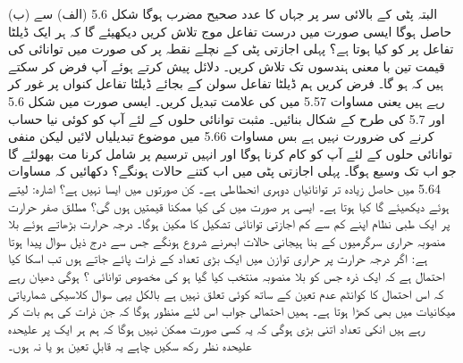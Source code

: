 (ب)  البتہ پٹی کے بالائی سر پر جہاں   کا عدد صحیح مضرب ہوگا شکل \num{5.6} (الف) سے  حاصل ہوگا ایسی صورت میں درست تفاعل موج تلاش کریں دیکھیئے گا کہ ہر ایک ڈیلٹا تفاعل پر  کو کیا ہوتا ہے؟
پہلی اجازتی پٹی کے نچلے نقطہ پر  کی صورت میں توانائی کی قیمت تین با معنی ہندسوں تک تلاش کریں۔ دلائل پیش کرتے ہوئے آپ فرض کر سکتے ہیں کہ ہو گا۔
فرض کریں ہم ڈیلٹا تفاعل سولن کے بجائے ڈیلٹا تفاعل کنواں پر غور کر رہے ہیں یعنی مساوات \num{5.57} میں  کی علامت تبدیل کریں۔ ایسی صورت میں شکل \num{5.6} اور \num{5.7} کی طرح کے شکال بنائیں۔ مثبت توانائی حلوں کے لئے آپ کو کوئی نیا حساب کرنے کی ضرورت نہیں ہے بس مساوات \num{5.66} میں موضوع تبدیلیاں لائیں لیکن منفی توانائی حلوں کے لئے آپ کو کام کرنا ہوگا اور انہیں ترسیم پر شامل کرنا مت بھولئے گا جو اب  تک وسیع ہوگا۔ پہلی اجازتی پٹی میں اب کتنے حالات ہونگے؟
دکھائیں کہ مساوات \num{5.64} میں حاصل زیادہ تر توانائیاں دوہری انحطاطی ہے۔ کن صورتوں میں ایسا نہیں ہے؟ اشارہ:  لیتے ہوئے دیکھیئے گا کیا ہوتا ہے۔ ایسی ہر صورت میں  کی کیا ممکنا قیمتیں ہوں گی؟
مطلق صفر حرارت پر ایک طبی نظام اپنے کم سے کم اجازتی توانائی  تشکیل کا مکین ہوگا۔ درجہ حرارت بڑھاتے ہوئے بلا منصوبہ حراری سرگرمیوں کے بنا ہیجانی حالات ابھرنے شروع ہونگے جس سے درج ذیل سوال پیدا ہوتا ہے: اگر  درجہ حرارت پر حراری توازن میں ایک بڑی تعداد  کے ذرات پائے جاتے ہوں تب اسکا کیا احتمال ہے کہ ایک ذرہ جس کو بلا منصوبہ منتخب کیا گیا ہو کی مخصوص توانائی ؟ ہوگی دھیان رہے کہ اس احتمال کا کوانٹم عدم تعین کے ساتھ کوئی تعلق نہیں ہے بالکل یہی سوال کلاسیکی شماریاتی میکانیات میں بھی کھڑا ہوتا ہے۔ ہمیں احتمالی جواب اس لئے منظور ہوگا کہ جن ذرات کی ہم بات کر رہے ہیں انکی تعداد اتنی بڑی ہوگی کہ یہ کسی صورت ممکن نہیں ہوگا کہ ہم ہر ایک پر علیحدہ علیحدہ نظر رکھ سکیں چاہے یہ قابلِ تعین ہو یا نہ ہوں۔

